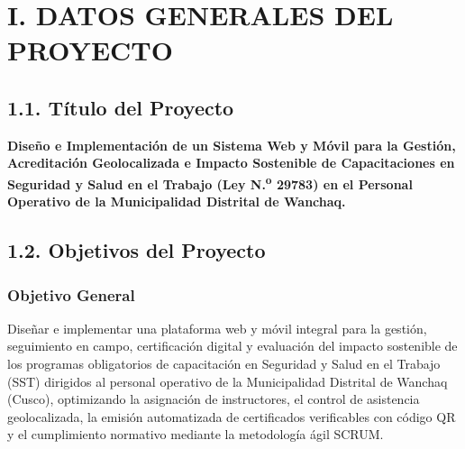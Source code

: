 \documentclass[11pt,a4paper]{article}
\begin{document}

\section*{I. DATOS GENERALES DEL PROYECTO}

\subsection*{1.1. Título del Proyecto}

\textbf{Diseño e Implementación de un Sistema Web y Móvil para la Gestión, Acreditación Geolocalizada e Impacto Sostenible de Capacitaciones en Seguridad y Salud en el Trabajo (Ley N.\textsuperscript{o} 29783) en el Personal Operativo de la Municipalidad Distrital de Wanchaq.}

\subsection*{1.2. Objetivos del Proyecto}

\subsubsection*{Objetivo General}
Diseñar e implementar una plataforma web y móvil integral para la gestión, seguimiento en campo, certificación digital y evaluación del impacto sostenible de los programas obligatorios de capacitación en Seguridad y Salud en el Trabajo (SST) dirigidos al personal operativo de la Municipalidad Distrital de Wanchaq (Cusco), optimizando la asignación de instructores, el control de asistencia geolocalizada, la emisión automatizada de certificados verificables con código QR y el cumplimiento normativo mediante la metodología ágil SCRUM.
\end{document}
